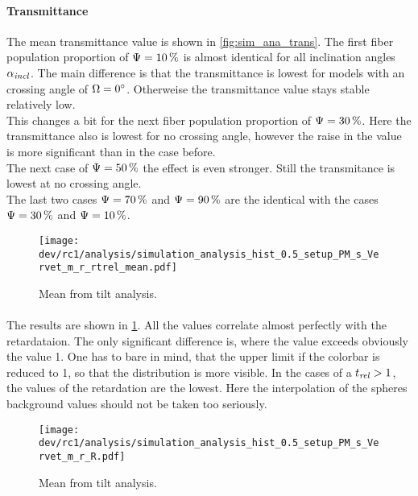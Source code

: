 \paragraph{Transmittance}
The mean transmittance value is shown in \cref{fig:sim_ana_trans}.
The first fiber population proportion of $\textnormal{$\Psi$}=\SI{10}{\percent}$ is almost identical for all inclination angles $\textnormal{$\alpha_{\mathit{incl}}$}$.
The main difference is that the transmittance is lowest for models with an crossing angle of $\textnormal{$\Omega$} = \SI{0}{\degree}$.
Otherweise the transmittance value stays stable relatively low.
\\
% 
This changes a bit for the next fiber population proportion of $\textnormal{$\Psi$}=\SI{30}{\percent}$.
Here the transmittance also is lowest for no crossing angle, however the raise in the value is more significant than in the case before.
\\
The next case of $\textnormal{$\Psi$}=\SI{50}{\percent}$ the effect is even stronger.
Still the transmitance is lowest at no crossing angle.
\\
The last two cases $\textnormal{$\Psi$}=\SI{70}{\percent}$ and $\textnormal{$\Psi$}=\SI{90}{\percent}$ are the identical with the cases $\textnormal{$\Psi$}=\SI{30}{\percent}$ and $\textnormal{$\Psi$}=\SI{10}{\percent}$.
% 
% 
% 
\begin{figure}[!p]
\centering
\texttt{[image: dev/rc1/analysis/simulation\_analysis\_hist\_0.5\_setup\_PM\_s\_Vervet\_m\_r\_rtrel\_mean.pdf]} 
\caption[Simulation \trel{}]{Mean \trel{} from tilt analysis.}
\label{fig:sim_ana_trel}
\end{figure}
% 
\paragraph{\trel}
The \trel{} results are shown in \cref{fig:sim_ana_trel}.
All the values correlate almost perfectly with the retardataion.
The only significant difference is, where the \trel{} value exceeds obviously the value 1.
One has to bare in mind, that the upper limit if the colorbar is reduced to 1, so that the distribution is more visible.
In the cases of a $\textnormal{$t_\mathit{rel}$} > 1$, the values of the retardation are the lowest.
Here the interpolation of the spheres background values should not be taken too seriously.
% 
% 
% 
\begin{figure}[!p]
\centering
\texttt{[image: dev/rc1/analysis/simulation\_analysis\_hist\_0.5\_setup\_PM\_s\_Vervet\_m\_r\_R.pdf]} 
\caption[Simulation \rvalue]{Mean \rvalue{} from tilt analysis.}
\label{fig:sim_ana_rvalue}
\end{figure}
% 
